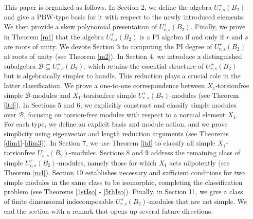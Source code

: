 \documentclass[12 pt,reqno]{amsart}
\numberwithin{equation}{section}
\newcommand{\B}{\mathcal{B}}
\theoremstyle{definition}
\theoremstyle{definition}
\theoremstyle{remark}
\theoremstyle{remark}
\begin{document}

This paper is organized as follows. In {Section 2}, we define the algebra $ U^+_{r,s}(B_2) $ and give a PBW-type basis for it with respect to the newly introduced elements. We then provide a skew polynomial presentation of $U^+_{r,s}(B_2)$. Finally, we prove in Theorem \ref{m1} that the algebra $U^+_{r,s}(B_2)$ is a PI algebra if and only if $r$ and $s$ are roots of unity. We devote {Section 3} to computing the PI degree of $U^+_{r,s}(B_2)$ at roots of unity (see Theorem \ref{m2}). In {Section 4}, we introduce a distinguished subalgebra $\mathcal{B} \subseteq U^+_{r,s}(B_2)$, which retains the essential structure of $U^+_{r,s}(B_2)$ but is algebraically simpler to handle. This reduction plays a crucial role in the latter classification. We prove a one-to-one correspondence between $X_1$-torsionfree simple $\mathcal{B}$-modules and $X_1$-torsionfree simple $U^+_{r,s}(B_2)$-modules (see Theorem \ref{itd}). In Sections 5 and  6, we explicitly construct and classify simple modules over $\B$, focusing on torsion-free modules with respect to a normal element $ X_1 $. For each type, we define an explicit basis and module action, and we prove simplicity using eigenvector and length reduction arguments (see Theorems \ref{dim1}-\ref{dim3}).  In {Section 7}, we use Theorem \ref{itd} to classify all simple $X_1$-torsionfree $ U^+_{r,s}(B_2) $-modules. Sections 8 and 9 address the remaining class of simple $ U^+_{r,s}(B_2) $-modules, namely those for which $ X_1 $ acts nilpotently (see Theorem \ref{m4}). Section 10 establishes necessary and sufficient conditions for two simple modules in the same class to be isomorphic, completing the classification problem (see Theorems \ref{1stIso} - \ref{5thIso}). Finally, in Section 11, we give a class of finite dimensional indecomposable $U_{r,s}^+(B_2)$-modules that are not simple. We end the section with a remark that opens up several future directions.
\end{document}
